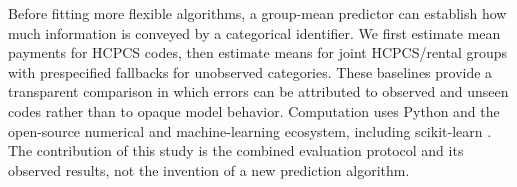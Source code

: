 Before fitting more flexible algorithms, a group-mean predictor can establish how much information is conveyed by a categorical identifier. We first estimate mean payments for HCPCS codes, then estimate means for joint HCPCS/rental groups with prespecified fallbacks for unobserved categories. These baselines provide a transparent comparison in which errors can be attributed to observed and unseen codes rather than to opaque model behavior. Computation uses Python and the open-source numerical and machine-learning ecosystem, including scikit-learn \citep{pedregosa2011}. The contribution of this study is the combined evaluation protocol and its observed results, not the invention of a new prediction algorithm.